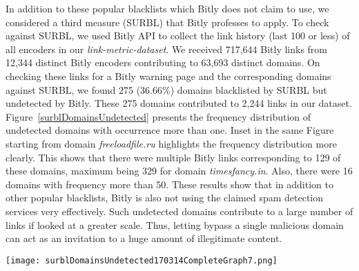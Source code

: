 \documentclass[conference]{IEEEtran}
\begin{document}
In addition to these popular blacklists which Bitly does not claim to use, we considered a third measure (SURBL) that Bitly professes to apply. To check against SURBL, we used Bitly API to collect the link history (last 100 or less) of all encoders in our \textit{link-metric-dataset}. We received 717,644 Bitly links from 12,344 distinct Bitly encoders contributing to 63,693 distinct domains. On checking these links for a Bitly warning page and the corresponding domains against SURBL, we found 275 (36.66\%) domains blacklisted by SURBL but undetected by Bitly. 
These 275 domains contributed to 2,244 links in our dataset. Figure~\ref{surblDomainsUndetected} presents the frequency distribution of undetected domains with occurrence more than one. Inset in the same Figure starting from domain \textit{freeloadfile.ru} highlights the frequency distribution more clearly. This shows that there were multiple Bitly links corresponding to 129 of these domains, maximum being 329 for domain \textit{timesfancy.in}. Also, there were 16 domains with frequency more than 50. These results show that in addition to other popular blacklists, Bitly is also not using the claimed spam detection services very effectively. Such undetected domains contribute to a large number of links if looked at a greater scale. Thus, letting bypass a single malicious domain can act as an invitation to a huge amount of illegitimate content.
\begin{figure*}[ht]
 	\centering
		\texttt{[image: surblDomainsUndetected170314CompleteGraph7.png]}
	\caption{Frequency distribution of SURBL domains undetected by Bitly (with frequency more than 1). Blacklisted domain \textit{timesfancy.in} has the maximum frequency and 16 domains have frequency greater than 50. Inset: Starting from domain \textit{freeloadfile.ru} shows the frequency distribution within the graph more clearly.}
		\label{surblDomainsUndetected}
\end{figure*}
\begin{figure*}[ht]
\centering
{}
\caption{(a) Cumulative distribution on number of Bitly users posting suspicious links. (b) Link history timeline for user \textit{bamsesang}. The link sharing interval and click pattern clearly reflects the malicious activity being carried out for a long time.}
\end{figure*}
\end{document}
